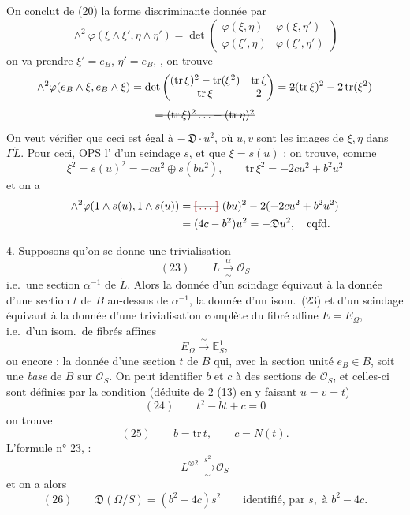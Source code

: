 \documentclass[11pt,a4paper]{article}
\begin{document}
On conclut de (20)  la forme discriminante  donnée par
\[
\wedge^2\varphi(\xi \wedge \xi', \eta \wedge \eta') = \det\begin{pmatrix} \varphi(\xi, \eta) & \varphi(\xi, \eta')\\ \varphi(\xi', \eta) & \varphi(\xi', \eta') \end{pmatrix}
\]
on va prendre $\xi' = e_B$, $\eta' = e_B$,  \add{$\xi = \eta$}, on trouve
\[
\wedge^2\varphi(e_B \wedge \xi, e_B \wedge \xi) = \det\begin{pmatrix} (\mathrm{tr}\,\xi)^2 - \mathrm{tr}(\xi^2) & \mathrm{tr}\,\xi\\ \mathrm{tr}\,\xi & 2 \end{pmatrix} = \text{\struck{$2$}}(\mathrm{tr}\,\xi)^2 - 2\,\mathrm{tr}(\xi^2)
\]
\[
\text{\struck{$= (\mathrm{tr}\,\xi)^2 \ldots - (\mathrm{tr}\,\eta)^2$}}
\]
On veut vérifier que ceci est égal à $-$$\,\mathfrak{D}\cdot u^2$, où $u, v$ sont les images de $\xi, \eta$ dans $\Gamma\check{L}$. Pour ceci, OPS  l' d'un scindage $s$, et que $\xi = s(u)$ \struck{\ill{}} ; on trouve, comme
\[
\xi^2 = s(u)^2 = -cu^2 \oplus s(bu^2), \qquad \mathrm{tr}\,\xi^2 = -2cu^2 + b^2u^2
\]
et on a
\[
\begin{aligned}
\wedge^2\varphi(1 \wedge s(u), 1 \wedge s(u)) &= \text{\struck{\ill{}}}\ (bu)^2 - 2(-2cu^2 + b^2u^2)\\
&= (4c - b^2)u^2 = -\mathfrak{D}u^2 , \quad \text{cqfd.}
\end{aligned}
\]

4. Supposons qu'on se donne une trivialisation
\[
(23)\qquad L \xrightarrow[\sim]{\;\alpha\;} \mathcal{O}_S
\]
i.e.\ une section $\alpha^{-1}$  de $\check{L}$. Alors la donnée d'un scindage équivaut à la donnée d'une section $t$ de $B$ au-dessus de $\alpha^{-1}$, la donnée d'un isom.\ (23) et d'un scindage équivaut à la donnée d'une trivialisation complète du fibré affine $E = E_\Omega$, i.e.\ d'un isom.\ de fibrés affines
\[
E_\Omega \xrightarrow{\;\sim\;} \mathbb{E}^1_S ,
\]
ou encore : la donnée d'une section $t$ de $B$ qui, avec la section unité $e_B \in B$,   soit une \emph{base} de $B$ sur $\mathcal{O}_S$. On peut  identifier $b$ et $c$ à des sections de $\mathcal{O}_S$, et celles-ci sont définies par la condition (déduite de 2 (13) en y faisant $u = v = t$)
\[
(24)\qquad t^2 - bt + c = 0
\]
on trouve
\[
(25)\qquad b = \mathrm{tr}\, t, \qquad c = N(t) .
\]
L'formule n° 23,  :
\[
L^{\otimes 2} \xrightarrow[\sim]{\;s^2\;} \mathcal{O}_S
\]
et on a alors
\[
(26)\qquad \mathfrak{D}(\Omega/S) = (b^2 - 4c)s^2 \qquad \text{identifié, par } s, \text{ à } b^2 - 4c .
\]
\end{document}
